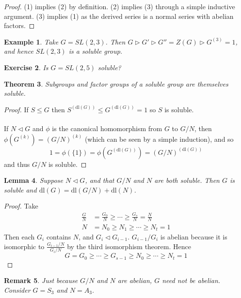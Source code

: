 \documentclass[a4paper,10pt]{article}
\newtheorem{thm}{Theorem}
\newtheorem{eg}[thm]{Example}
\newtheorem{Ex}[thm]{Exercise}
\newtheorem{Lem}[thm]{Lemma}
\newtheorem{rem}[thm]{Remark}
\begin{document}
\begin{proof}
(1) implies (2) by definition. (2) implies (3) through a simple inductive argument. (3) implies (1) as the derived series is a normal series with abelian factors. 
\end{proof}


\begin{eg}
Take $G = SL(2,3)$. Then $G \triangleright G' \triangleright G'' = Z(G) \triangleright G^{(3)} = 1$, and hence $SL(2,3)$ is a soluble group. 
\end{eg}

\begin{Ex}
Is $G = SL(2,5)$ soluble?
\end{Ex}

\begin{thm}
Subgroups and factor groups of a soluble group are themselves soluble.
\end{thm}

\begin{proof}
If $S \leq G$ then $S^{(\text{dl}(G))} \leq G^{(\text{dl}(G))} = 1$ so $S$ is soluble. \\
\\
If $N \triangleleft G$ and $\phi$ is the canonical homomorphism from $G$ to $G / N$, then $\phi(G^{(k)}) = (G / N)^{(k)}$ (which can be seen by a simple induction), and so 
\[ 1 = \phi(\{1\}) = \phi( G^{(\text{dl}(G))} ) = (G / N)^{(\text{dl}(G))} \]
and thus $G / N$ is soluble. 
\end{proof}


\begin{Lem}
Suppose $N \triangleleft G$, and that $G / N$ and $N$ are both soluble. Then $G$ is soluble and $\text{dl}(G) =  \text{dl}(G / N) + \text{dl}(N)$.
\end{Lem}

\begin{proof}
Take
\begin{align*}
\frac{G}{N} &= \frac{G_0}{N} \geq \cdots \geq \frac{G_s}{N} = \frac{N}{N} \\
N &= N_0 \geq N_1 \geq \cdots \geq N_t = 1  
\end{align*}
Then each $G_i$ contains $N$, and $G_i \triangleleft G_{i-1}$. $G_{i-1} / G_i$ is abelian because it is isomorphic to $\frac{G_{i-1}/N}{G_i / N}$ by the third isomorphism theorem. Hence
\[ G = G_0 \geq \cdots \geq G_{s-1} \geq N_0 \geq \cdots \geq N_t = 1 \] 
\end{proof}


\begin{rem}
Just because $G/N$ and $N$ are abelian, $G$ need not be abelian. Consider $G = S_3$ and $N = A_3$.
\end{rem}
\end{document}
